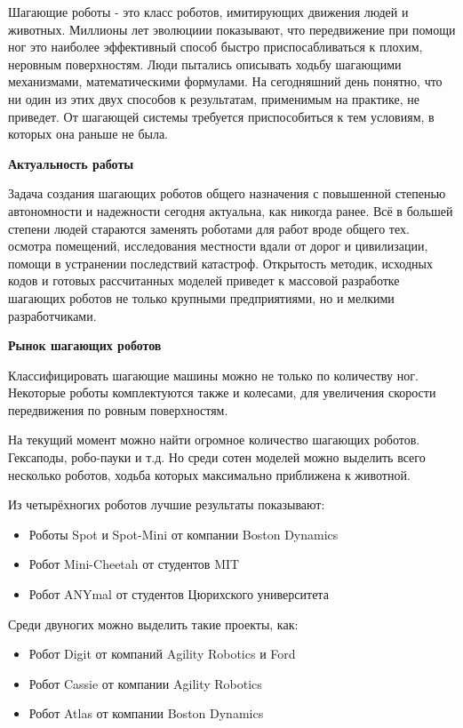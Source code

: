 
Шагающие роботы - это класс роботов, имитирующих движения людей и животных. Миллионы лет эволюциии показывают, что передвижение при помощи ног это наиболее эффективный способ быстро приспосабливаться к плохим, неровным поверхностям. Люди пытались описывать ходьбу шагающими механизмами, математическими формулами. На сегодняшний день понятно, что ни один из этих двух способов к результатам, применимым на практике, не приведет. От шагающей системы требуется приспособиться к тем условиям, в которых она раньше не была.

\textbf{Актуальность работы}

Задача создания шагающих роботов общего назначения с повышенной степенью автономности и надежности сегодня актуальна, как никогда ранее. Всё в большей степени людей стараются заменять роботами для работ вроде общего тех. осмотра помещений, исследования местности вдали от дорог и цивилизации, помощи в устранении последствий катастроф. Открытость методик, исходных кодов и готовых рассчитанных моделей приведет к массовой разработке шагающих роботов не только крупными предприятиями, но и мелкими разработчиками.

\textbf{Рынок шагающих роботов}

Классифицировать шагающие машины можно не только по количеству ног. Некоторые роботы комплектуются также и колесами, для увеличения скорости передвижения по ровным поверхностям. 

На текущий момент можно найти огромное количество шагающих роботов. Гексаподы, робо-пауки и т.д. Но среди сотен моделей можно выделить всего несколько роботов, ходьба которых максимально приближена к животной.

Из четырёхногих роботов лучшие результаты показывают:
\begin{itemize}
    \item Роботы Spot и Spot-Mini от компании Boston Dynamics
    \item Робот Mini-Cheetah от студентов MIT
    \item Робот ANYmal от студентов Цюрихского университета
\end{itemize}

Среди двуногих можно выделить такие проекты, как:

\begin{itemize}
    \item Робот Digit от компаний Agility Robotics и Ford
    \item Робот Cassie от компании Agility Robotics
    \item Робот Atlas от компании Boston Dynamics
\end{itemize}


